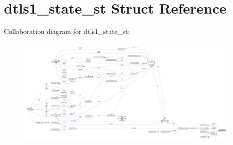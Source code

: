 \hypertarget{structdtls1__state__st}{}\section{dtls1\+\_\+state\+\_\+st Struct Reference}
\label{structdtls1__state__st}


Collaboration diagram for dtls1\+\_\+state\+\_\+st\+:
\nopagebreak
\begin{figure}[H]
\begin{center}
\leavevmode
\includegraphics[width=350pt]{structdtls1__state__st__coll__graph}
\end{center}
\end{figure}
